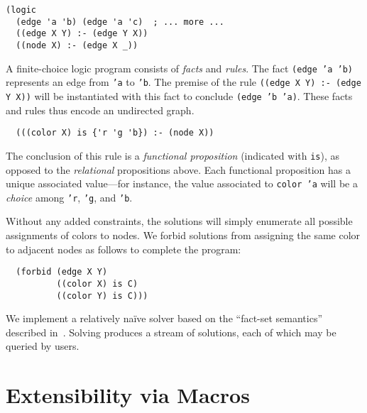 \documentclass[dvipsnames,sigplan,screen,review,anonymous,acmthm,nonacm]{acmart}
\begin{document}
\begin{verbatim}
(logic
  (edge 'a 'b) (edge 'a 'c)  ; ... more ...
  ((edge X Y) :- (edge Y X))
  ((node X) :- (edge X _))
\end{verbatim}
A finite-choice logic program consists of \emph{facts} and \emph{rules}.
The fact \texttt{(edge 'a 'b)} represents an edge from \texttt{'a} to \texttt{'b}.
The premise of the rule \texttt{((edge X Y) :- (edge Y X))} will be
instantiated with this fact to conclude \texttt{(edge 'b 'a)}.
These facts and rules thus encode an undirected graph.

\begin{verbatim}
  (((color X) is {'r 'g 'b}) :- (node X))
\end{verbatim}
The conclusion of this rule is a \emph{functional proposition}
(indicated with \texttt{is}), as opposed to the \emph{relational} propositions above.
Each functional proposition has a unique associated value---for instance,
the value associated to \texttt{color 'a} will be a
\emph{choice} among \texttt{'r}, \texttt{'g}, and \texttt{'b}.

Without any added constraints, the solutions will simply enumerate all
possible assignments of colors to nodes. We forbid solutions from
assigning the same color to adjacent nodes as follows to complete the \miniDusa{} program:

\begin{verbatim}
  (forbid (edge X Y)
          ((color X) is C)
          ((color Y) is C)))
\end{verbatim}

We implement a relatively naïve solver based on the ``fact-set semantics''
described in~\cite{martens2025dusa}. Solving produces a stream of solutions,
each of which may be queried by users.

\section{Extensibility via Macros}
\end{document}
